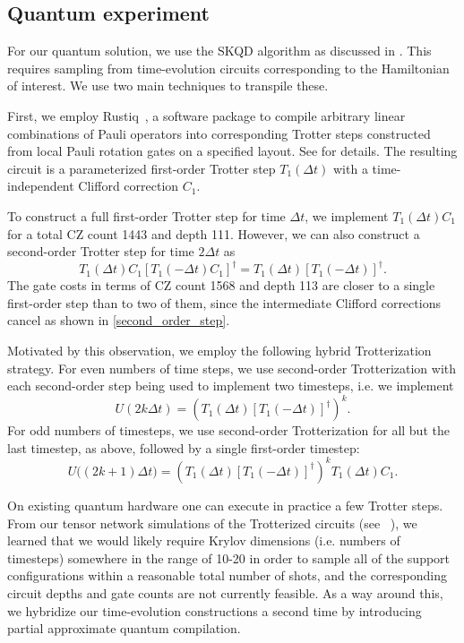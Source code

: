 \documentclass[
  reprint,            %
  amsmath,amssymb,
  aps,
  superscriptaddress, %
  longbibliography
]{revtex4-2}
\theoremstyle{definition}
\begin{document}
\subsection{Quantum experiment}
\label{sec:quantum_expt}

For our quantum solution, we use the SKQD algorithm as discussed in .
This requires sampling from time-evolution circuits corresponding to the Hamiltonian of interest.
We use two main techniques to transpile these.

First, we employ Rustiq~\cite{martiel2025rustiq,debrugiere2024faster}, a software package to compile arbitrary linear combinations of Pauli operators into corresponding Trotter steps constructed from local Pauli rotation gates on a specified layout.
See  for details.
The resulting circuit is a parameterized first-order Trotter step $T_1(\Delta t)$ with a time-independent Clifford correction $C_1$.

To construct a full first-order Trotter step for time $\Delta t$, we implement $T_1(\Delta t)C_1$ for a total CZ count 1443 and depth 111.
However, we can also construct a second-order Trotter step for time $2\Delta t$ as
\begin{equation}
\label{second_order_step}
    T_1(\Delta t)C_1[T_1(-\Delta t)C_1]^\dagger = T_1(\Delta t)[T_1(-\Delta t)]^\dagger.
\end{equation}
The gate costs in terms of CZ count 1568 and depth 113 are closer to a single first-order step than to two of them, since the intermediate Clifford corrections cancel as shown in \eqref{second_order_step}.

Motivated by this observation, we employ the following hybrid Trotterization strategy.
For even numbers of time steps, we use second-order Trotterization with each second-order step being used to implement two timesteps, i.e. we implement
\begin{equation}
    U(2k\Delta t)=\left(T_1(\Delta t)[T_1(-\Delta t)]^\dagger\right)^{k}.
\end{equation}
For odd numbers of timesteps, we use second-order Trotterization for all but the last timestep, as above, followed by a single first-order timestep:
\begin{equation}
    U\big((2k+1)\Delta t\big)=\left(T_1(\Delta t)[T_1(-\Delta t)]^\dagger\right)^{k}T_1(\Delta t)C_1.
\end{equation}

On existing quantum hardware one can execute in practice a few Trotter steps.
From our tensor network simulations of the Trotterized circuits (see ~), we learned that we would likely require Krylov dimensions (i.e. numbers of timesteps) somewhere in the range of 10-20 in order to sample all of the support configurations within a reasonable total number of shots, and the corresponding circuit depths and gate counts are not currently feasible.
As a way around this, we hybridize our time-evolution constructions a second time by introducing partial approximate quantum compilation.
\end{document}

